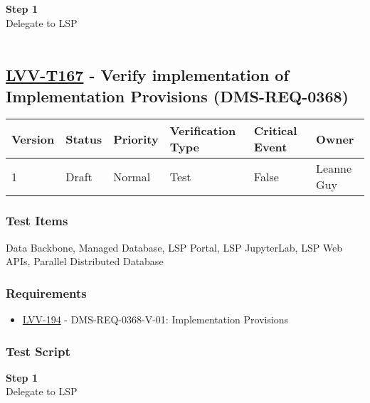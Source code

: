 \textbf{Step 1}\\
Delegate to LSP\\
~\\

\hypertarget{lvv-t167---verify-implementation-of-implementation-provisions-dms-req-0368}{%
\subsection{\texorpdfstring{\href{https://jira.lsstcorp.org/secure/Tests.jspa\#/testCase/LVV-T167}{LVV-T167}
- Verify implementation of Implementation Provisions
(DMS-REQ-0368)}{LVV-T167 - Verify implementation of Implementation Provisions (DMS-REQ-0368)}}\label{lvv-t167---verify-implementation-of-implementation-provisions-dms-req-0368}}

\begin{longtable}[]{@{}llllll@{}}
\toprule
Version & Status & Priority & Verification Type & Critical Event &
Owner\tabularnewline
\midrule
\endhead
1 & Draft & Normal & Test & False & Leanne Guy\tabularnewline
\bottomrule
\end{longtable}

\hypertarget{test-items-143}{%
\subsubsection{Test Items}\label{test-items-143}}

Data Backbone, Managed Database, LSP Portal, LSP JupyterLab, LSP Web
APIs, Parallel Distributed Database~

\hypertarget{requirements-144}{%
\subsubsection{Requirements}\label{requirements-144}}

\begin{itemize}
\tightlist
\item
  \href{https://jira.lsstcorp.org/browse/LVV-194}{LVV-194} -
  DMS-REQ-0368-V-01: Implementation Provisions
\end{itemize}

\hypertarget{test-script-144}{%
\subsubsection{Test Script}\label{test-script-144}}

\textbf{Step 1}\\
Delegate to LSP\\
~\\

